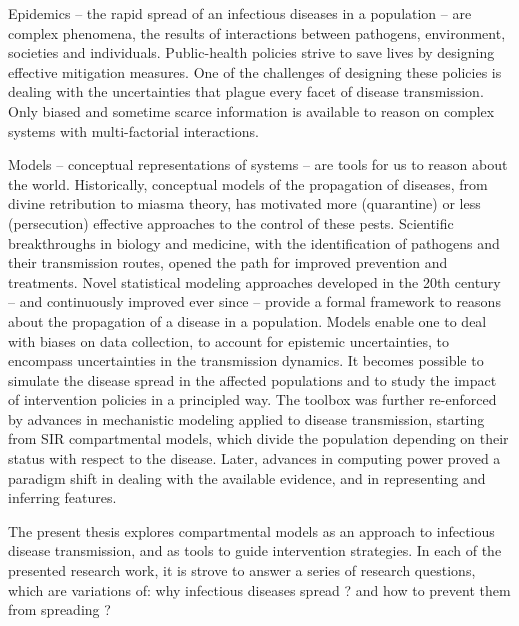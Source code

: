 Epidemics -- the rapid spread of an infectious diseases in a population -- are  complex phenomena, the results of interactions between pathogens, environment, societies and individuals\cite{Rinaldo:RiverNetworksEcological:2020a, Buckee:ThinkingClearlySocial:2021, Heesterbeek:ModelingInfectiousDisease:2015}. Public-health policies strive to save lives by designing effective mitigation measures. One of the challenges of designing these policies is dealing with the uncertainties that plague every facet of disease transmission. Only biased and sometime scarce information is available to reason on complex systems with multi-factorial interactions.

Models -- conceptual representations of systems -- are tools for us to reason about the world. Historically, conceptual models of the propagation of diseases, from divine retribution to miasma theory, has motivated more (quarantine) or less (persecution) effective approaches to the control of these pests. Scientific breakthroughs in biology and medicine, with the identification of pathogens and their transmission routes, opened the path for improved prevention and treatments. Novel statistical modeling approaches\cite[-3\baselineskip]{Freedman:AssociationCausationRemarks:1999} developed in the 20th century -- and continuously improved ever since\cite{Gelman:WhatAreMost:2021} --  provide a formal framework to reasons about the propagation of a disease in a population. Models enable one to deal with biases on data collection, to account for epistemic uncertainties, to encompass uncertainties in the transmission dynamics. It becomes possible to simulate the disease spread in the affected populations and to study the impact of intervention policies in a principled way. The toolbox was further re-enforced by advances in mechanistic modeling applied to disease transmission, starting from SIR compartmental models\cite{Kermack:ContributionMathematicalTheory:1927, Anderson:PopulationBiologyInfectious:1979}, which divide the population depending on their status with respect to the disease. Later, advances in computing power proved a paradigm shift in dealing with the available evidence, and in representing and inferring features. 


The present thesis explores compartmental models as an approach to infectious disease transmission, and as tools to guide intervention strategies. In each of the presented research work, it is strove to answer a series of research questions, which are variations of: why infectious diseases spread ? and how to prevent them from spreading ?

